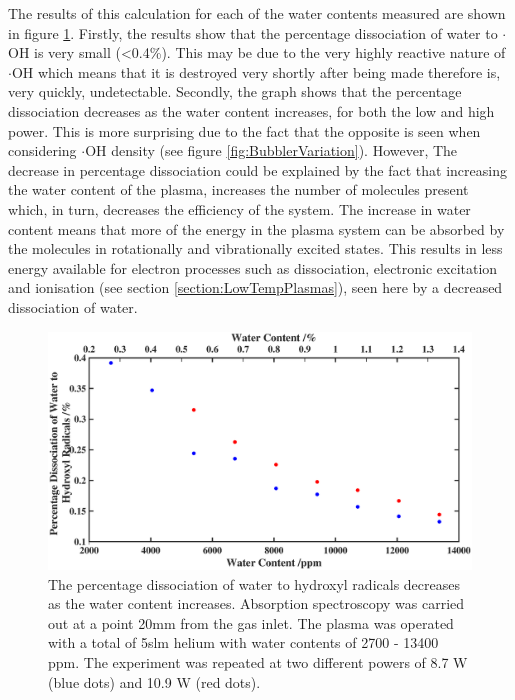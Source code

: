 \documentclass[11pt, oneside]{article}   	%
\begin{document}
The results of this calculation for each of the water contents measured are shown in figure \ref{fig:BubblerDissociation}.
Firstly, the results show that the percentage dissociation of water to $\cdot$OH is very small (\textless 0.4\%). This may be due to the very highly reactive nature of $\cdot$OH which means that it is destroyed very shortly after being made therefore is, very quickly, undetectable.
Secondly, the graph shows that the percentage dissociation decreases as the water content increases, for both the low and high power.
This is more surprising due to the fact that the opposite is seen when considering $\cdot$OH density (see figure \ref{fig:BubblerVariation}).
However, The decrease in percentage dissociation could be explained by the fact that increasing the water content of the plasma, increases the number of molecules present which, in turn, decreases the efficiency of the system.
The increase in water content means that more of the energy in the plasma system can be absorbed by the molecules in rotationally and vibrationally excited states.
This results in less energy available for electron processes such as dissociation, electronic excitation and ionisation (see section \ref{section:LowTempPlasmas}), seen here by a decreased dissociation of water.





\begin{figure}
    \centering
    \includegraphics[width=\textwidth]{Figures/BubblerDissociationBig.eps}
    \caption{The percentage dissociation of water to hydroxyl radicals decreases as the water content increases. Absorption spectroscopy was carried out at a point 20mm from the gas inlet. The plasma was operated with a total of 5slm helium with water contents of 2700 - 13400 ppm. The experiment was repeated at two different powers of 8.7 W (blue dots) and 10.9 W (red dots).}
    \label{fig:BubblerDissociation}
\end{figure}
\end{document}
